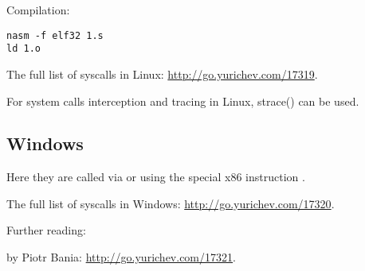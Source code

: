 

Compilation:

\begin{lstlisting}
nasm -f elf32 1.s
ld 1.o
\end{lstlisting}

The full list of syscalls in Linux: \url{http://go.yurichev.com/17319}.

For system calls interception and tracing in Linux, strace() can be used.

\subsection{Windows}


Here they are called via  
or using the special x86 instruction .

The full list of syscalls in Windows: \url{http://go.yurichev.com/17320}.

Further reading:

 by Piotr Bania: \url{http://go.yurichev.com/17321}.

